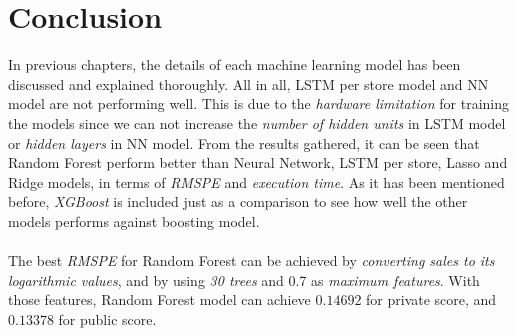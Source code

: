 \chapter{Conclusion}
In previous chapters, the details of each machine learning model has been discussed and explained thoroughly. All in all, LSTM per store model and NN model are not performing well. This is due to the \textit{hardware limitation} for training the models since we can not increase the \textit{number of hidden units} in LSTM model or \textit{hidden layers} in NN model. From the results gathered, it can be seen that Random Forest perform better than Neural Network, LSTM per store, Lasso and Ridge models, in terms of \textit{RMSPE} and \textit{execution time}. As it has been mentioned before, \textit{XGBoost} is included just as a comparison to see how well the other models performs against boosting model. \\ \\
The best \textit{RMSPE} for Random Forest can be achieved by \textit{converting sales to its logarithmic values}, and by using \textit{30 trees} and 0.7 as \textit{maximum features}. With those features, Random Forest model can achieve $0.14692$ for private score, and $0.13378$ for public score.  
